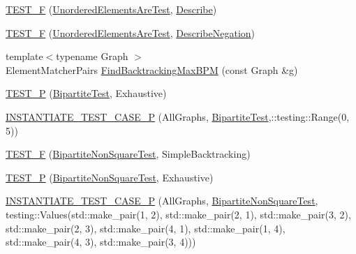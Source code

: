 \begin{DoxyCompactItemize}
\hyperlink{namespacetesting_1_1gmock__matchers__test_a937f4d835023cd6322eb7d32596f3f43}{T\+E\+S\+T\+\_\+F} (\hyperlink{classtesting_1_1gmock__matchers__test_1_1UnorderedElementsAreTest}{Unordered\+Elements\+Are\+Test}, \hyperlink{namespacetesting_1_1gmock__matchers__test_a36ae44e4f6c8e9fe3fe9162132503717}{Describe})
\item 
\hyperlink{namespacetesting_1_1gmock__matchers__test_a3c4c92b68a08c5d541e46ed367e216ab}{T\+E\+S\+T\+\_\+F} (\hyperlink{classtesting_1_1gmock__matchers__test_1_1UnorderedElementsAreTest}{Unordered\+Elements\+Are\+Test}, \hyperlink{namespacetesting_1_1gmock__matchers__test_afbc8022da5a58aa467ec414ab3e90908}{Describe\+Negation})
\item 
{\footnotesize template$<$typename Graph $>$ }\\Element\+Matcher\+Pairs \hyperlink{namespacetesting_1_1gmock__matchers__test_a09321a8d4a4c40ab1e369fbdf92b0414}{Find\+Backtracking\+Max\+B\+PM} (const Graph \&g)
\item 
\hyperlink{namespacetesting_1_1gmock__matchers__test_a20589d957fcfe5399e249084dbc23e82}{T\+E\+S\+T\+\_\+P} (\hyperlink{classtesting_1_1gmock__matchers__test_1_1BipartiteTest}{Bipartite\+Test}, Exhaustive)
\item 
\hyperlink{namespacetesting_1_1gmock__matchers__test_a3ca71a91f2b60ab08922acb7da0f8df0}{I\+N\+S\+T\+A\+N\+T\+I\+A\+T\+E\+\_\+\+T\+E\+S\+T\+\_\+\+C\+A\+S\+E\+\_\+P} (All\+Graphs, \hyperlink{classtesting_1_1gmock__matchers__test_1_1BipartiteTest}{Bipartite\+Test},\+::testing\+::\+Range(0, 5))
\item 
\hyperlink{namespacetesting_1_1gmock__matchers__test_a7d2395b1cb6a90bdc8d46ae06f99f6c7}{T\+E\+S\+T\+\_\+F} (\hyperlink{classtesting_1_1gmock__matchers__test_1_1BipartiteNonSquareTest}{Bipartite\+Non\+Square\+Test}, Simple\+Backtracking)
\item 
\hyperlink{namespacetesting_1_1gmock__matchers__test_a3ac913ed55a7ac2636ae7bfce04296e9}{T\+E\+S\+T\+\_\+P} (\hyperlink{classtesting_1_1gmock__matchers__test_1_1BipartiteNonSquareTest}{Bipartite\+Non\+Square\+Test}, Exhaustive)
\item 
\hyperlink{namespacetesting_1_1gmock__matchers__test_a64ef722e930c3088ddea704ac20194b5}{I\+N\+S\+T\+A\+N\+T\+I\+A\+T\+E\+\_\+\+T\+E\+S\+T\+\_\+\+C\+A\+S\+E\+\_\+P} (All\+Graphs, \hyperlink{classtesting_1_1gmock__matchers__test_1_1BipartiteNonSquareTest}{Bipartite\+Non\+Square\+Test}, testing\+::\+Values(std\+::make\+\_\+pair(1, 2), std\+::make\+\_\+pair(2, 1), std\+::make\+\_\+pair(3, 2), std\+::make\+\_\+pair(2, 3), std\+::make\+\_\+pair(4, 1), std\+::make\+\_\+pair(1, 4), std\+::make\+\_\+pair(4, 3), std\+::make\+\_\+pair(3, 4)))

\end{DoxyCompactItemize}
